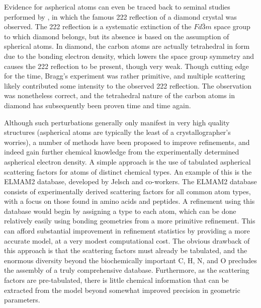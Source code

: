 \begin{refsection}
Evidence for aspherical atoms can even be traced back to seminal studies performed by \citeauthor{Bragg1920}, in which the famous 222 reflection of a diamond crystal was observed.
The 222 reflection is a systematic extinction of the $ Fd\bar{3}m $ space group to which diamond belongs, but its absence is based on the assumption of spherical atoms.
In diamond, the carbon atoms are actually tetrahedral in form due to the bonding electron density, which lowers the space group symmetry and causes the 222 reflection to be present, though very weak.\autocite{Bragg1920}
Though cutting edge for the time, Bragg's experiment was rather primitive, and multiple scattering likely contributed some intensity to the observed 222 reflection.
The observation was nonetheless correct, and the tetrahedral nature of the carbon atoms in diamond has subsequently been proven time and time again.

Although such perturbations generally only manifest in very high quality structures (aspherical atoms are typically the least of a crystallographer's worries), a number of methods have been proposed to improve refinements, and indeed gain further chemical knowledge from the experimentally determined aspherical electron density.
A simple approach is the use of tabulated aspherical scattering factors for atoms of distinct chemical types.
An example of this is the ELMAM2 database, developed by Jelsch and co-workers.\autocite{Domagaa2012}
The ELMAM2 database consists of experimentally derived scattering factors for all common atom types, with a focus on those found in amino acids and peptides.
A refinement using this database would begin by assigning a type to each atom, which can be done relatively easily using bonding geometries from a more primitive refinement.
This can afford substantial improvement in refinement statistics by providing a more accurate model, at a very modest computational cost.
The obvious drawback of this approach is that the scattering factors must already be tabulated, and the enormous diversity beyond the biochemically important C, H, N, and O precludes the assembly of a truly comprehensive database.
Furthermore, as the scattering factors are pre-tabulated, there is little chemical information that can be extracted from the model beyond somewhat improved precision in geometric parameters.


\end{refsection}
